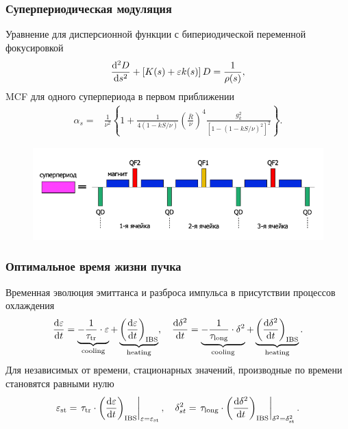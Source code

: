 \begin{frame}
	\frametitle{Суперпериодическая модуляция}
	Уравнение для дисперсионной функции с бипериодической переменной фокусировкой
	\begin{equation}
		\dv[2]{D}{s}+\left[K(s)+\varepsilon k(s)\right]D=\frac{1}{\rho(s)} ,
		\label{eq:disp_eq}
	\end{equation}
	MCF для одного суперпериода в первом приближении
	\begin{equation}
		\begin{aligned}
			\alpha_s= & \frac{1}{\nu^2}\left\{1+\frac{1}{4(1-k S / \nu)}\left(\frac{\bar{R}}{\nu}\right)^4 \frac{g_k^2}{\left[1-(1-k S / \nu)^2\right]^2}\right\}.
		\end{aligned}
		\label{eq:alpha_gradient}
	\end{equation}
	\begin{figure}
		\includegraphics[width=0.6\linewidth]{images/2_superperiod}
	\end{figure}
\end{frame}
\begin{frame}
	\frametitle{Оптимальное время жизни пучка}
	Временная эволюция эмиттанса и разброса импульса в присутствии процессов охлаждения
	\begin{equation}
		\dv{\varepsilon}{t} =\underbrace{-\frac{1}{\tau_{\text{tr}}} \cdot \varepsilon}_{\text{cooling}}+\underbrace{\left(\dv{\varepsilon}{t}\right)_{\text{IBS}}}_{\text{heating}}, \quad
		\dv{\delta^2}{t} =\underbrace{-\frac{1}{\tau_{\text{long}}} \cdot \delta^2}_{\text{cooling}}+\underbrace{\left(\dv{\delta^2}{t}\right)_{\text{IBS}}}_{\text{heating}}.
	\end{equation}
	Для независимых от времени, стационарных значений, производные по времени становятся равными нулю
	\begin{equation}
		\varepsilon_{\textrm{st}}=\left.\tau_{\text{tr}} \cdot\left(\dv{\varepsilon}{t}\right)_{\text{IBS}}\right|_{\varepsilon=\varepsilon_{\text{st}}}, \quad
		\delta_{st}^2=\left.\tau_{\text{long}} \cdot\left(\dv{\delta^2}{t}\right)_{\text{IBS}}\right|_{\delta^2=\delta_{\text{st}}^2}.
	\end{equation}
\end{frame}
